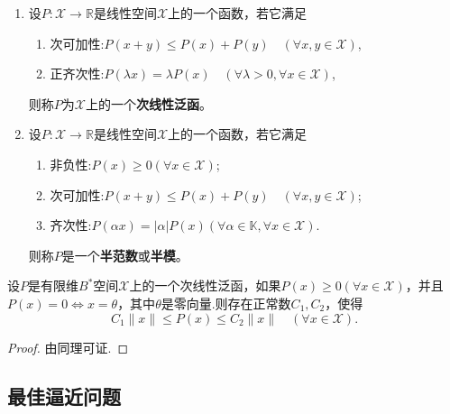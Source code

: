 \documentclass[../../main.tex]{subfiles}%
\begin{document}
\begin{definition}
\begin{enumerate}
\item 设$P: \mathscr{X} \to \mathbb{R}$是线性空间$\mathscr{X}$上的一个函数，若它满足
\begin{enumerate}[(1)]
\item 次可加性:$P(x+y) \leqslant P(x)+P(y) \quad (\forall x,y \in \mathscr{X})$,
\item 正齐次性:$P(\lambda x) = \lambda P(x) \quad (\forall \lambda>0, \forall x \in \mathscr{X})$,
\end{enumerate}
则称$P$为$\mathscr{X}$上的一个\textbf{次线性泛函}。

\item 设$P: \mathscr{X} \to \mathbb{R}$是线性空间$\mathscr{X}$上的一个函数，若它满足
\begin{enumerate}[(1)]
\item 非负性:$P(x) \geqslant 0 (\forall x \in \mathscr{X})$;

\item 次可加性:$P(x+y) \leqslant P(x)+P(y) \quad (\forall x,y \in \mathscr{X})$;

\item 齐次性:$P(\alpha x)=|\alpha| P(x) (\forall \alpha \in \mathbb{K}, \forall x \in \mathscr{X})$.
\end{enumerate}
则称$P$是一个\textbf{半范数}或\textbf{半模}。
\end{enumerate}
\end{definition}

\begin{theorem}\label{theorem:泛函分析--定理1.4.22}
设$P$是有限维$B^*$空间$\mathscr{X}$上的一个次线性泛函，如果$P(x) \geqslant 0 (\forall x \in \mathscr{X})$，并且$P(x)=0 \iff x=\theta$，其中$\theta$是零向量.则存在正常数$C_1,C_2$，使得
$$C_1\|x\| \leqslant P(x) \leqslant C_2\|x\| \quad (\forall x \in \mathscr{X}).$$
\end{theorem}
\begin{proof}

由同理可证.
\end{proof}


\subsection{最佳逼近问题}
\end{document}
